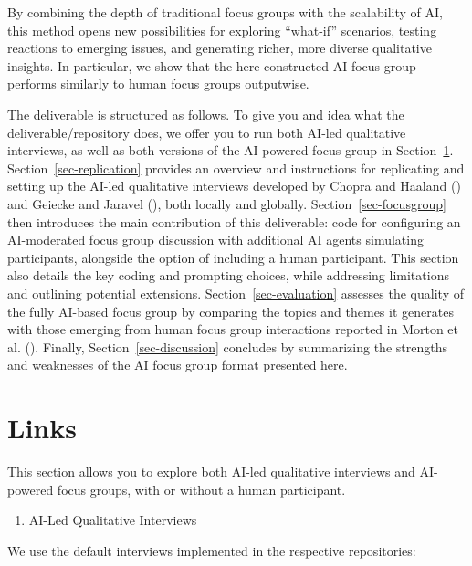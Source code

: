 \documentclass[
  letterpaper,
  DIV=11,
  numbers=noendperiod]{scrartcl}
\providecommand{\tightlist}{%
  \setlength{\itemsep}{0pt}\setlength{\parskip}{0pt}}
\begin{document}
By combining the depth of traditional focus groups with the scalability
of AI, this method opens new possibilities for exploring ``what-if''
scenarios, testing reactions to emerging issues, and generating richer,
more diverse qualitative insights. In particular, we show that the here
constructed AI focus group performs similarly to human focus groups
outputwise.

The deliverable is structured as follows. To give you and idea what the
deliverable/repository does, we offer you to run both AI-led qualitative
interviews, as well as both versions of the AI-powered focus group in
Section~\ref{sec-links}. Section~\ref{sec-replication} provides an
overview and instructions for replicating and setting up the AI-led
qualitative interviews developed by Chopra and Haaland
() and Geiecke and Jaravel
(), both locally and globally.
Section~\ref{sec-focusgroup} then introduces the main contribution of
this deliverable: code for configuring an AI-moderated focus group
discussion with additional AI agents simulating participants, alongside
the option of including a human participant. This section also details
the key coding and prompting choices, while addressing limitations and
outlining potential extensions. Section~\ref{sec-evaluation} assesses
the quality of the fully AI-based focus group by comparing the topics
and themes it generates with those emerging from human focus group
interactions reported in Morton et al.
().
Finally, Section~\ref{sec-discussion} concludes by summarizing the
strengths and weaknesses of the AI focus group format presented here.

\section{Links}\label{sec-links}

This section allows you to explore both AI-led qualitative interviews
and AI-powered focus groups, with or without a human participant.

\begin{enumerate}
\def\labelenumi{\arabic{enumi}.}
\tightlist
\item
  AI-Led Qualitative Interviews
\end{enumerate}

We use the default interviews implemented in the respective
repositories:
\end{document}
